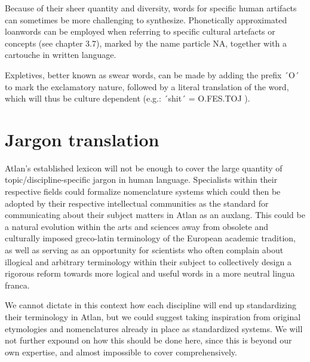 \noindent Because of their sheer quantity and diversity, words for specific human artifacts can sometimes be more challenging to synthesize. Phonetically approximated loanwords can be employed when referring to specific cultural artefacts or concepts (see chapter 3.7), marked by the name particle NA, together with a cartouche in written language. 

Expletives, better known as swear words, can be made by adding the prefix ´O´ \Atlano to mark the exclamatory nature, followed by a literal translation of the word, which will thus be culture dependent (e.g.: ´shit´ = O.FES.TOJ \Atlano \fes \toj). 

\section{Jargon translation}


Atlan’s established lexicon will not be enough to cover the large quantity of topic/discipline-specific jargon in human language. Specialists within their respective fields could formalize nomenclature systems which could then be adopted by their respective intellectual communities as the standard for communicating about their subject matters in Atlan as an auxlang. This could be a natural evolution within the arts and sciences away from obsolete and culturally imposed greco-latin terminology of the European academic tradition, as well as serving as an opportunity for scientists who often complain about illogical and arbitrary terminology within their subject to collectively design a rigorous reform towards more logical and useful words in a more neutral lingua franca.  

We cannot dictate in this context how each discipline will end up standardizing their terminology in Atlan, but we could suggest taking inspiration from original etymologies and nomenclatures already in place as standardized systems. We will not further expound on how this should be done here, since this is beyond our own expertise, and almost impossible to cover comprehensively.







